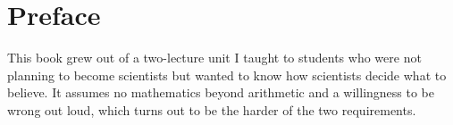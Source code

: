 \chapter*{Preface}

This book grew out of a two-lecture unit I taught to students who were
not planning to become scientists but wanted to know how scientists
decide what to believe. It assumes no mathematics beyond arithmetic
and a willingness to be wrong out loud, which turns out to be the
harder of the two requirements.
